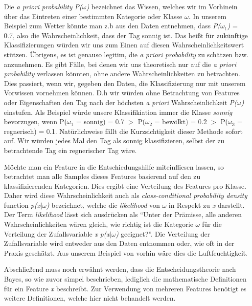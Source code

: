 \noindent
Die \textit{a priori probability} \textit{P($\omega$)} bezeichnet das Wissen, welches wir im Vorhinein über das Eintreten einer bestimmten Kategorie oder Klasse $\omega$. In unserem Beispiel zum Wetter könnte man z.b aus den Daten entnehmen,
dass \textit{P($\omega_1$)} = 0.7, also die Wahrscheinlichkeit, dass der Tag sonnig ist. Das heißt für zukünftige Klassifizierungen würden wir uns zum Einen auf diesen Wahrscheinlichkeitswert stützen. Übrigens, es ist genauso legitim, die \textit{a priori probability} zu schätzen bzw. anzunehmen.
Es gibt Fälle, bei denen wir uns theoretisch nur auf die \textit{a priori probability} verlassen könnten, ohne andere Wahrscheinlichkeiten zu betrachten. Dies passiert, wenn wir, gegeben den Daten, die Klassifizierung nur mit unserem Vorwissen vornehmen können. D.h wir würden
ohne Betrachtung von Features oder Eigenschaften den Tag nach der höchsten \textit{a priori} Wahrscheinlichkeit \textit{P($\omega$)} einstufen.  
Als Beispiel würde unsere Klassifikiation immer die Klasse \textit{sonnig} bevorzugen, wenn P($\omega_1$ = sonnig) = 0.7 $>$ P($\omega_2$ = bewölkt) = 0.2 $>$ P($\omega_3$ = regnerisch) = 0.1. Natürlichweise fällt die Kurzsichtigkeit dieser Methode sofort auf. 
Wir würden jedes Mal den Tag als sonnig klassifizieren, selbst der zu betrachtende Tag ein regnerischer Tag wäre.

\bigskip\noindent
Möchte man ein Feature in die Entschiedungshilfe miteinfliesen lassen, so betrachtet man alle Samples dieses Features basierend auf
den zu klassifizierenden Kategorien. Dies ergibt eine Verteilung des Features pro Klasse. Daher wird diese Wahrscheinlichkeit auch als 
\textit{class-conditional probability density} function \textit{p(x$\mid$$\omega$)} bezeichnet, welche die \textit{likelihood} von $\omega$ in Respekt zu \textit{x} darstellt. Der Term \textit{likelihood} lässt sich ausdrücken als 
``Unter der Prämisse, alle anderen Wahrscheinlichkeiten wären gleich, wie richtig ist die Kategorie $\omega$ für die Verteilung der Zufallsvariable \textit{x} \textit{p(x$\mid$$\omega$)} geeignet?''. Die Verteilung der Zufallsvariable wird entweder aus den Daten entnommen oder,
wie oft in der Praxis geschätzt. Aus unserem Beispiel von vorhin wäre dies die Luftfeuchtigkeit.

\bigskip\noindent
Abschließend muss noch erwähnt werden, dass die Entscheidungstheorie nach Bayes, so wie zuvor simpel beschrieben, lediglich die mathematische Definitionen für ein Feature \textit{x} beschreibt. Zur Verwendung von mehreren Features benötigt es weitere Definitionen, welche hier nicht behandelt werden.

